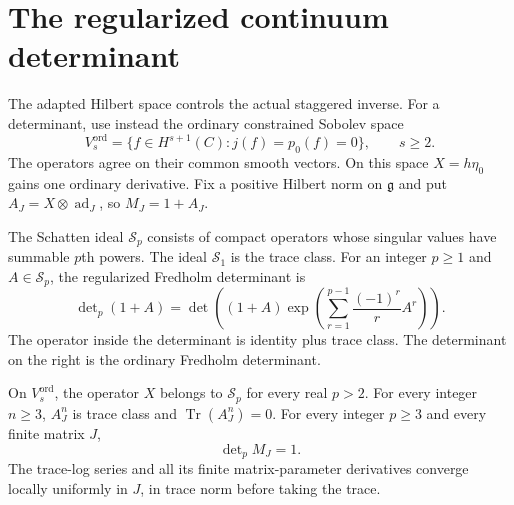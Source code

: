 \section{The regularized continuum determinant}

The adapted Hilbert space controls the actual staggered inverse.
For a determinant, use instead the ordinary constrained Sobolev
space
\[
 V_s^{\mathrm{ord}}
   =\{f\in H^{s+1}(C):j(f)=p_0(f)=0\},\qquad s\geq2.
\]
The operators agree on their common smooth vectors. On this
space $X=h\eta_0$ gains one ordinary derivative.
Fix a positive Hilbert norm on $\mathfrak g$ and put
$A_J=X\otimes\operatorname{ad}_J$, so $M_J=1+A_J$.

The Schatten ideal $\mathcal S_p$ consists of compact operators
whose singular values have summable $p$th powers. The ideal
$\mathcal S_1$ is the trace class. For an integer $p\geq1$ and
$A\in\mathcal S_p$, the regularized Fredholm determinant is
\begin{equation}\label{mht:eq:regularized-neumann-determinant}
 \det\nolimits_p(1+A)
  =\det\left((1+A)
       \exp\left(\sum_{r=1}^{p-1}\frac{(-1)^r}{r}A^r\right)\right).
\end{equation}
The operator inside the determinant is identity plus trace class.
The determinant on the right is the ordinary Fredholm determinant.

\begin{theorem}\label{mht:thm:neumann-continuum-determinant}
On $V_s^{\mathrm{ord}}$, the operator $X$ belongs to
$\mathcal S_p$ for every real $p>2$. For every integer $n\geq3$,
$A_J^n$ is trace class and $\operatorname{Tr}(A_J^n)=0$.
For every integer $p\geq3$ and every finite matrix $J$,
\[
 \det\nolimits_p M_J=1.
\]
The trace-log series and all its finite matrix-parameter
derivatives converge locally uniformly in $J$, in trace norm
before taking the trace.
\end{theorem}

